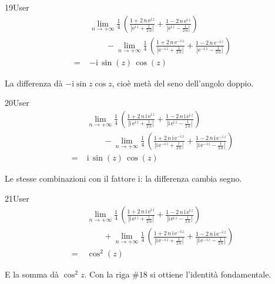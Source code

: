 \begin{espr}{19}{User}{}
\begin{align*}
& \lim_{n \to +\infty} \frac{1}{4}\, \left(\frac{1 + 2\, n\, \mathrm{e}^{\mathrm{i}\, z}}{\left|\mathrm{e}^{\mathrm{i}\, z} + \frac{1}{2\, n}\right|} + \frac{1 - 2\, n\, \mathrm{e}^{\mathrm{i}\, z}}{\left|\mathrm{e}^{\mathrm{i}\, z} - \frac{1}{2\, n}\right|}\right) \\
&\qquad - \lim_{n \to +\infty} \frac{1}{4}\, \left(\frac{1 + 2\, n\, \mathrm{e}^{-\mathrm{i}\, z}}{\left|\mathrm{e}^{-\mathrm{i}\, z} + \frac{1}{2\, n}\right|} + \frac{1 - 2\, n\, \mathrm{e}^{-\mathrm{i}\, z}}{\left|\mathrm{e}^{-\mathrm{i}\, z} - \frac{1}{2\, n}\right|}\right) \\
=\;& -\mathrm{i}\, \sin\!\left(z\right)\, \cos\!\left(z\right)
\end{align*}
\end{espr}
La differenza dà $-\mathrm{i}\sin z\cos z$, cioè metà del seno dell'angolo doppio.

\begin{espr}{20}{User}{}
\begin{align*}
& \lim_{n \to +\infty} \frac{1}{4}\, \left(\frac{1 + 2\, n\, \mathrm{i}\, \mathrm{e}^{\mathrm{i}\, z}}{\left|\mathrm{i}\, \mathrm{e}^{\mathrm{i}\, z} + \frac{1}{2\, n}\right|} + \frac{1 - 2\, n\, \mathrm{i}\, \mathrm{e}^{\mathrm{i}\, z}}{\left|\mathrm{i}\, \mathrm{e}^{\mathrm{i}\, z} - \frac{1}{2\, n}\right|}\right) \\
&\qquad - \lim_{n \to +\infty} \frac{1}{4}\, \left(\frac{1 + 2\, n\, \mathrm{i}\, \mathrm{e}^{-\mathrm{i}\, z}}{\left|\mathrm{i}\, \mathrm{e}^{-\mathrm{i}\, z} + \frac{1}{2\, n}\right|} + \frac{1 - 2\, n\, \mathrm{i}\, \mathrm{e}^{-\mathrm{i}\, z}}{\left|\mathrm{i}\, \mathrm{e}^{-\mathrm{i}\, z} - \frac{1}{2\, n}\right|}\right) \\
=\;& \mathrm{i}\, \sin\!\left(z\right)\, \cos\!\left(z\right)
\end{align*}
\end{espr}
Le stesse combinazioni con il fattore $\mathrm{i}$: la differenza cambia segno.

\begin{espr}{21}{User}{}
\begin{align*}
& \lim_{n \to +\infty} \frac{1}{4}\, \left(\frac{1 + 2\, n\, \mathrm{i}\, \mathrm{e}^{\mathrm{i}\, z}}{\left|\mathrm{i}\, \mathrm{e}^{\mathrm{i}\, z} + \frac{1}{2\, n}\right|} + \frac{1 - 2\, n\, \mathrm{i}\, \mathrm{e}^{\mathrm{i}\, z}}{\left|\mathrm{i}\, \mathrm{e}^{\mathrm{i}\, z} - \frac{1}{2\, n}\right|}\right) \\
&\qquad + \lim_{n \to +\infty} \frac{1}{4}\, \left(\frac{1 + 2\, n\, \mathrm{i}\, \mathrm{e}^{-\mathrm{i}\, z}}{\left|\mathrm{i}\, \mathrm{e}^{-\mathrm{i}\, z} + \frac{1}{2\, n}\right|} + \frac{1 - 2\, n\, \mathrm{i}\, \mathrm{e}^{-\mathrm{i}\, z}}{\left|\mathrm{i}\, \mathrm{e}^{-\mathrm{i}\, z} - \frac{1}{2\, n}\right|}\right) \\
=\;& \cos^{2}\!\left(z\right)
\end{align*}
\end{espr}
E la somma dà $\cos^2 z$. Con la riga $\#18$ si ottiene l'identità fondamentale.


